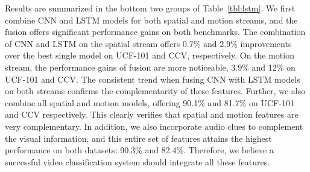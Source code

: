 \documentclass[journal]{IEEEtran}
\begin{document}
Results are summarized in the bottom two groups of Table~\ref{tbl:lstm}. We first combine CNN and LSTM models for both spatial and motion streams, and the fusion offers significant performance gains on both benchmarks. The combination of CNN and LSTM on the spatial stream offers 0.7\% and 2.9\% improvements over the best single model on UCF-101 and CCV, respectively. On the motion stream, the performance gains of fusion are more noticeable, 3.9\% and 12\% on UCF-101 and CCV. The consistent trend when fusing CNN with LSTM models on both streams confirms the complementarity of these features. Further, we also combine all spatial and motion models, offering 90.1\% and 81.7\% on UCF-101 and CCV respectively. This clearly verifies that spatial and motion features are very complementary. In addition, we also incorporate audio clues to complement the visual information, and this entire set of features attains the highest performance on both datasets: 90.3\% and 82.4\%. Therefore, we believe a successful video classification system should integrate all these features. 
\end{document}

